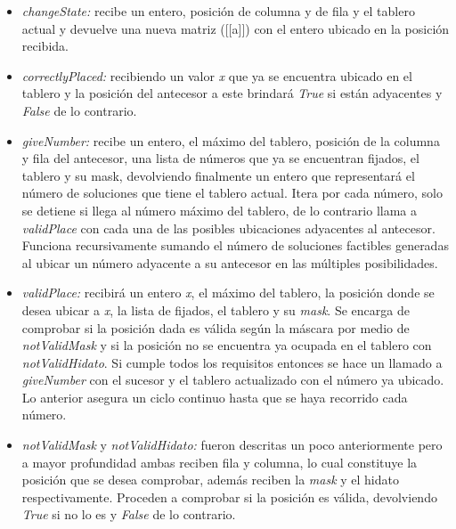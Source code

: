 \documentclass[10pt]{amsart}
\begin{document}
\begin{itemize}
        \item \textit{changeState:} recibe un entero, posici\'on de columna y de fila y el tablero actual y devuelve una nueva matriz ([[a]]) con el entero ubicado en la posici\'on recibida.
        
        \item \textit{correctlyPlaced:} recibiendo un valor \textit{x} que ya se encuentra ubicado en el tablero y la posici\'on del antecesor a este brindar\'a \textit{True} si est\'an adyacentes y \textit{False} de lo contrario.
        
        \item \textit{giveNumber:} recibe un entero, el m\'aximo del tablero, posici\'on de la columna y fila del antecesor, una lista de números que ya se encuentran fijados, el tablero y su mask, devolviendo finalmente un entero que representar\'a el n\'umero de soluciones que tiene el tablero actual. Itera por cada n\'umero, solo se detiene si llega al número m\'aximo del tablero, de lo contrario llama a \textit{validPlace} con cada una de las posibles ubicaciones adyacentes al antecesor. Funciona recursivamente sumando el n\'umero de soluciones factibles generadas al ubicar un n\'umero adyacente a su antecesor en las m\'ultiples posibilidades.
	
        \item \textit{validPlace:} recibir\'a un entero \textit{x}, el m\'aximo del tablero, la posici\'on donde se desea ubicar a \textit{x}, la lista de fijados, el tablero y su \textit{mask}. Se encarga de comprobar si la posici\'on dada es v\'alida seg\'un la m\'ascara por medio de \textit{notValidMask} y si la posici\'on no se encuentra ya ocupada en el tablero con \textit{notValidHidato}. Si cumple todos los requisitos entonces se hace un llamado a \textit{giveNumber} con el sucesor y el tablero actualizado con el n\'umero ya ubicado. Lo anterior asegura un ciclo continuo hasta que se haya recorrido cada n\'umero.
	
        \item \textit{notValidMask} y \textit{notValidHidato:} fueron descritas un poco anteriormente pero a mayor profundidad ambas reciben fila y columna, lo cual constituye la posici\'on que se desea comprobar, adem\'as reciben la \textit{mask} y el hidato respectivamente. Proceden a comprobar si la posici\'on es v\'alida, devolviendo \textit{True} si no lo es y \textit{False} de lo contrario.
    
    \end{itemize}
	 
\end{document}
